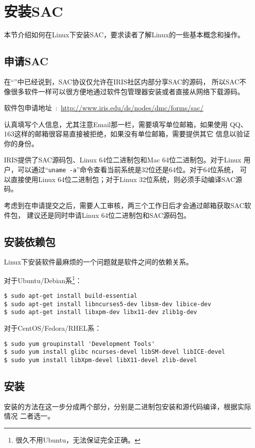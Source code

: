 \section{安装SAC}
\label{sec:sac-install}
本节介绍如何在Linux下安装SAC，要求读者了解Linux的一些基本概念和操作。

\subsection*{申请SAC}
在``''中已经说到，SAC协议仅允许在IRIS社区内部分享SAC的源码，
所以SAC不像很多软件一样可以很方便地通过软件包管理器安装或者直接从网络下载源码。

软件包申请地址~:~\url{http://www.iris.edu/ds/nodes/dmc/forms/sac/}

认真填写个人信息，尤其注意Email那一栏，需要填写单位邮箱，如果使用
QQ、163这样的邮箱很容易直接被拒绝，如果没有单位邮箱，需要提供其它
信息以验证你的身份。

IRIS提供了SAC源码包、Linux 64位二进制包和Mac 64位二进制包。对于Linux
用户，可以通过``\verb+uname -a+''命令查看当前系统是32位还是64位。对于64位系统，
可以直接使用Linux 64位二进制包；对于Linux 32位系统，则必须手动编译SAC源码。

考虑到在申请提交之后，需要人工审核，两三个工作日后才会通过邮箱获取SAC软件包，
建议还是同时申请Linux 64位二进制包和SAC源码包。

\subsection*{安装依赖包}
Linux下安装软件最麻烦的一个问题就是软件之间的依赖关系。

对于Ubuntu/Debian系\footnote{很久不用Ubuntu，无法保证完全正确。}：
\begin{verbatim}
$ sudo apt-get install build-essential
$ sudo apt-get install libncurses5-dev libsm-dev libice-dev
$ sudo apt-get install libxpm-dev libx11-dev zlib1g-dev
\end{verbatim}

对于CentOS/Fedora/RHEL系：
\begin{verbatim}
$ sudo yum groupinstall 'Development Tools'
$ sudo yum install glibc ncurses-devel libSM-devel libICE-devel
$ sudo yum install libXpm-devel libX11-devel zlib-devel
\end{verbatim}

\subsection*{安装}
安装的方法在这一步分成两个部分，分别是二进制包安装和源代码编译，根据实际情况
二者选一。

